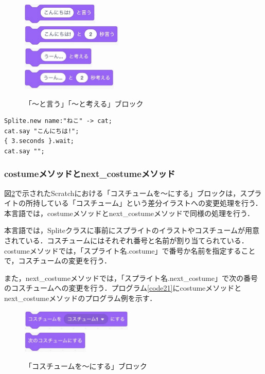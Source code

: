 \documentclass[10pt,a4j]{ltjsarticle}
\begin{document}
\begin{figure}[H]
  \centering
  \includegraphics[height=10mm]{images/say.pdf} \\
  \includegraphics[height=10mm]{images/say_time.pdf} \\
  \includegraphics[height=10mm]{images/think.pdf} \\
  \includegraphics[height=10mm]{images/think_time.pdf} 
  \caption{「〜と言う」「〜と考える」ブロック}
  \label{fig:say}
\end{figure}

\begin{lstlisting}[caption=sayメソッドのプログラム例, label=code20]
Splite.new name:"ねこ" -> cat;
cat.say "こんにちは!";
{ 3.seconds }.wait;
cat.say "";
\end{lstlisting}

\subsubsection{costumeメソッドとnext\_costumeメソッド}
図\ref{fig:costume}で示されたScratchにおける「コスチュームを〜にする」ブロックは，スプライトの所持している「コスチューム」という差分イラストへの変更処理を行う．本言語では，costumeメソッドとnext\_costumeメソッドで同様の処理を行う．

本言語では，Spliteクラスに事前にスプライトのイラストやコスチュームが用意されている．コスチュームにはそれぞれ番号と名前が割り当てられている．costumeメソッドでは，「スプライト名.costume」で番号か名前を指定することで，コスチュームの変更を行う．

また，next\_costumeメソッドでは，「スプライト名.next\_costume」で次の番号のコスチュームへの変更を行う．プログラム\ref{code21}にcostumeメソッドとnext\_costumeメソッドのプログラム例を示す．

\begin{figure}[H]
  \centering
  \includegraphics[height=10mm]{images/wear.pdf} \\
  \includegraphics[height=10mm]{images/next_wear.pdf} 
  \caption{「コスチュームを〜にする」ブロック}
  \label{fig:costume}
\end{figure}
\end{document}
